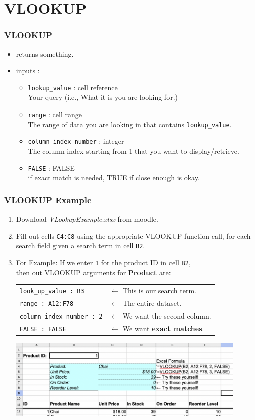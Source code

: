 \documentclass[12pt]{beamer}
\begin{document}
\section{VLOOKUP}
\begin{frame}
	\frametitle{VLOOKUP}
	\begin{itemize}
		\item returns something.
		\item inputs : 
			\begin{itemize}
				\item \texttt{lookup\_value} : cell reference\\
				Your query (i.e., What it is you are looking for.) 
				\item \texttt{range} : cell range\\
				The range of data you are looking in that contains \texttt{lookup\_value}.
				\item \texttt{column\_index\_number} : integer\\
				The column index starting from 1 that you want to display/retrieve.
				\item \texttt{FALSE} : FALSE\\ if exact match is needed, TRUE if close enough is okay.
			\end{itemize}
		\end{itemize}
\end{frame}
\begin{frame}
	\frametitle{VLOOKUP Example}
	\begin{enumerate}
	\item Download \textit{VLookupExample.xlsx} from moodle.
	\item Fill out cells \texttt{C4:C8} using the appropriate VLOOKUP function call, for each search field given a search term in cell \texttt{B2}. 
	\item For Example: If we enter \texttt{1} for the product ID in cell \texttt{B2},\\  then out VLOOKUP arguments for \textbf{Product} are:
		\begin{tabular}{l l }
		 	\texttt{look\_up\_value : B3}& $\leftarrow$ This is our search term.\\
		 	\texttt{range : A12:F78}& $\leftarrow$  The entire dataset.\\
		 	\texttt{column\_index\_number : 2} &$\leftarrow$ We want the second column.\\
		 	\texttt{FALSE : FALSE}& $\leftarrow$ We want \textbf{exact matches}.\\
		 \end{tabular}

	 	\includegraphics[width =0.9\textwidth ]{VLOOKUPEx.png}
	\end{enumerate}
\end{frame}
\end{document}

